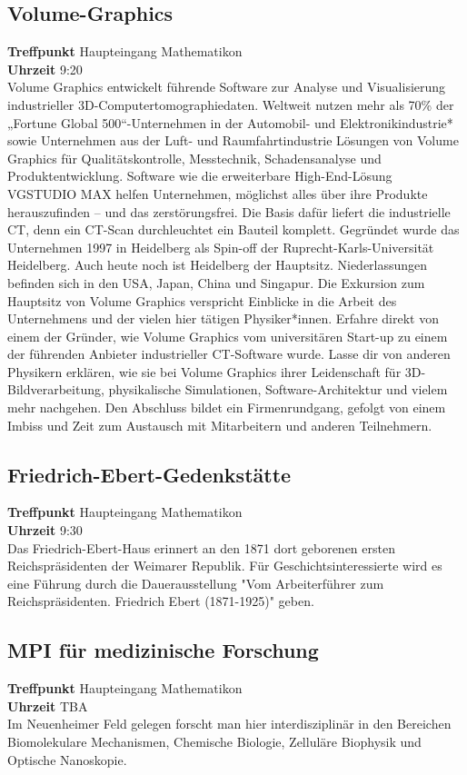 \subsection*{Volume-Graphics}
\textbf{Treffpunkt} Haupteingang Mathematikon\\
\textbf{Uhrzeit} 9:20\\
Volume Graphics entwickelt führende Software zur Analyse und Visualisierung industrieller 3D-Computertomographiedaten. Weltweit nutzen mehr als 70\% der „Fortune Global 500“-Unternehmen in der Automobil- und Elektronikindustrie* sowie Unternehmen aus der Luft- und Raumfahrtindustrie Lösungen von Volume Graphics für Qualitätskontrolle, Messtechnik, Schadensanalyse und Produktentwicklung. Software wie die erweiterbare High-End-Lösung VGSTUDIO MAX helfen Unternehmen, möglichst alles über ihre Produkte herauszufinden – und das zerstörungsfrei. Die Basis dafür liefert die industrielle CT, denn ein CT-Scan durchleuchtet ein Bauteil komplett. Gegründet wurde das Unternehmen 1997 in Heidelberg als Spin-off der Ruprecht-Karls-Universität Heidelberg. Auch heute noch ist Heidelberg der Hauptsitz. Niederlassungen befinden sich in den USA, Japan, China und Singapur. Die Exkursion zum Hauptsitz von Volume Graphics verspricht Einblicke in die Arbeit des Unternehmens und der vielen hier tätigen Physiker*innen. Erfahre direkt von einem der Gründer, wie Volume Graphics vom universitären Start-up zu einem der führenden Anbieter industrieller CT-Software wurde. Lasse dir von anderen Physikern erklären, wie sie bei Volume Graphics ihrer Leidenschaft für 3D-Bildverarbeitung, physikalische Simulationen, Software-Architektur und vielem mehr nachgehen. Den Abschluss bildet ein Firmenrundgang, gefolgt von einem Imbiss und Zeit zum Austausch mit Mitarbeitern und anderen Teilnehmern. 

\subsection*{Friedrich-Ebert-Gedenkstätte}
\textbf{Treffpunkt} Haupteingang Mathematikon\\
\textbf{Uhrzeit} 9:30\\
Das Friedrich-Ebert-Haus erinnert an den 1871 dort geborenen ersten Reichspräsidenten der Weimarer Republik. Für Geschichtsinteressierte wird es eine Führung durch die Dauerausstellung "Vom Arbeiterführer zum Reichspräsidenten. Friedrich Ebert (1871-1925)" geben.

\subsection*{MPI für medizinische Forschung}
\textbf{Treffpunkt} Haupteingang Mathematikon\\
\textbf{Uhrzeit} TBA\\
Im Neuenheimer Feld gelegen forscht man hier interdisziplinär in den Bereichen Biomolekulare Mechanismen, Chemische Biologie, Zelluläre Biophysik und Optische Nanoskopie. 

